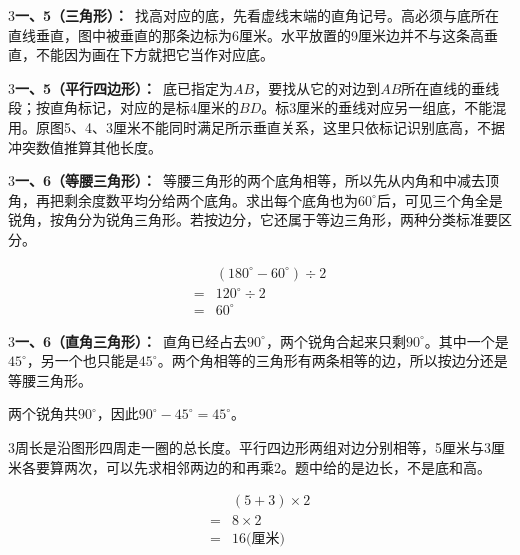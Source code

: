 \documentclass[multi=snippet,border={5bp 20bp 5bp 5bp}]{standalone}
\newenvironment{snippet}[3]{\begin{minipage}{#1bp}\color{answerred}\fontsize{#2}{#3}\selectfont\raggedright}{\end{minipage}}
\begin{document}
\begin{snippet}{505}{11.5}{14}\begin{multicols}{3}\raggedcolumns \textbf{一、5（三角形）：}\ 找高对应的底，先看虚线末端的直角记号。高必须与底所在直线垂直，图中被垂直的那条边标为6厘米。水平放置的9厘米边并不与这条高垂直，不能因为画在下方就把它当作对应底。\end{multicols}\end{snippet}
\begin{snippet}{505}{11.5}{14}\begin{multicols}{3}\raggedcolumns \textbf{一、5（平行四边形）：}\ 底已指定为\(AB\)\allowbreak ，要找从它的对边到\(AB\)\allowbreak 所在直线的垂线段；按直角标记，对应的是标4厘米的\(BD\)\allowbreak 。标3厘米的垂线对应另一组底，不能混用。原图5、4、3厘米不能同时满足所示垂直关系，这里只依标记识别底高，不据冲突数值推算其他长度。\end{multicols}\end{snippet}
\begin{snippet}{505}{11.5}{14}\begin{multicols}{3}\raggedcolumns \textbf{一、6（等腰三角形）：}\ 等腰三角形的两个底角相等，所以先从内角和中减去顶角，再把剩余度数平均分给两个底角。求出每个底角也为\(60^\circ\)\allowbreak 后，可见三个角全是锐角，按角分为锐角三角形。若按边分，它还属于等边三角形，两种分类标准要区分。\par \[\begin{aligned}&(180^\circ-60^\circ)\div2\\={}&120^\circ\div2\\={}&60^\circ\end{aligned}\]\end{multicols}\end{snippet}
\begin{snippet}{505}{11.5}{14}\begin{multicols}{3}\raggedcolumns \textbf{一、6（直角三角形）：}\ 直角已经占去\(90^\circ\)\allowbreak ，两个锐角合起来只剩\(90^\circ\)\allowbreak 。其中一个是\(45^\circ\)\allowbreak ，另一个也只能是\(45^\circ\)\allowbreak 。两个角相等的三角形有两条相等的边，所以按边分还是等腰三角形。\par 两个锐角共\(90^\circ\)\allowbreak ，因此\(90^\circ-45^\circ=45^\circ\)\allowbreak 。\end{multicols}\end{snippet}
\begin{snippet}{505}{11.5}{14}\begin{multicols}{3}\raggedcolumns 周长是沿图形四周走一圈的总长度。平行四边形两组对边分别相等，5厘米与3厘米各要算两次，可以先求相邻两边的和再乘2。题中给的是边长，不是底和高。\par \[\begin{aligned}&(5+3)\times2\\={}&8\times2\\={}&16\text{(厘米)}\end{aligned}\]\end{multicols}\end{snippet}
\end{document}
